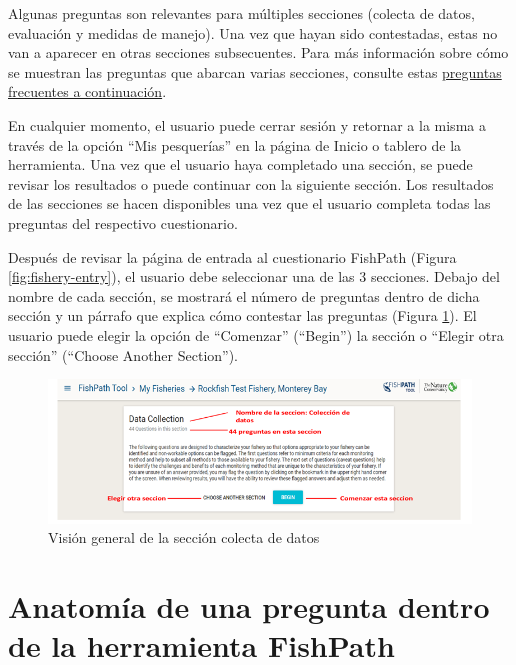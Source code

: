 \documentclass[
  11pt,
]{book}
\begin{document}
Algunas preguntas son relevantes para múltiples secciones (colecta de datos, evaluación y medidas de manejo). Una vez que hayan sido contestadas, estas no van a aparecer en otras secciones subsecuentes. Para más información sobre cómo se muestran las preguntas que abarcan varias secciones, consulte estas \protect\hyperlink{faq-question-numbering}{preguntas frecuentes a continuación}.

En cualquier momento, el usuario puede cerrar sesión y retornar a la misma a través de la opción ``Mis pesquerías'' en la página de Inicio o tablero de la herramienta. Una vez que el usuario haya completado una sección, se puede revisar los resultados o puede continuar con la siguiente sección. Los resultados de las secciones se hacen disponibles una vez que el usuario completa todas las preguntas del respectivo cuestionario.

Después de revisar la página de entrada al cuestionario FishPath (Figura \ref{fig:fishery-entry}), el usuario debe seleccionar una de las 3 secciones. Debajo del nombre de cada sección, se mostrará el número de preguntas dentro de dicha sección y un párrafo que explica cómo contestar las preguntas (Figura \ref{fig:dc-overview}). El usuario puede elegir la opción de ``Comenzar'' (``Begin'') la sección o ``Elegir otra sección'' (``Choose Another Section'').

\begin{figure}

{\centering \includegraphics[width=0.95\linewidth]{images/dc-overview-es} 

}

\caption{Visión general de la sección colecta de datos}\label{fig:dc-overview}
\end{figure}

\hypertarget{anatomuxeda-de-una-pregunta-dentro-de-la-herramienta-fishpath}{%
\section{Anatomía de una pregunta dentro de la herramienta FishPath}\label{anatomuxeda-de-una-pregunta-dentro-de-la-herramienta-fishpath}}
\end{document}
